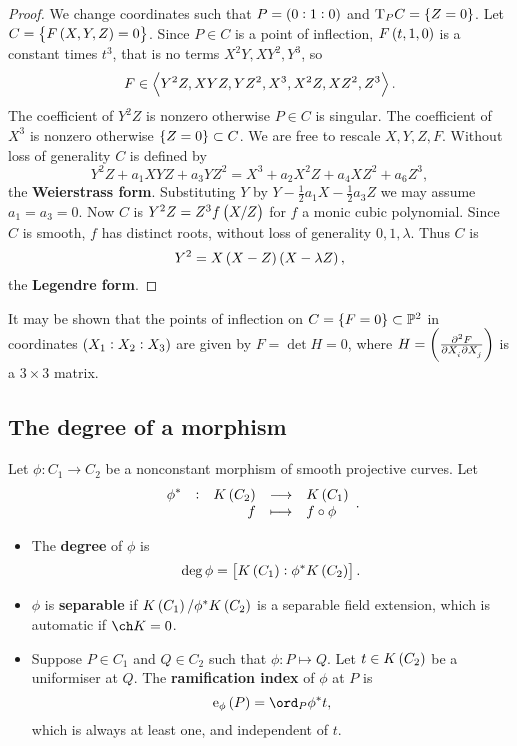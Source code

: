 \begin{proof}
We change coordinates such that $ P = \br{0 : 1 : 0} $ and $ \T_PC = \cbr{Z = 0} $. Let $ C = \cbr{F\br{X, Y, Z} = 0} $. Since $ P \in C $ is a point of inflection, $ F\br{t, 1, 0} $ is a constant times $ t^3 $, that is no terms $ X^2Y, XY^2, Y^3 $, so
$$ F \in \left\langle Y^2Z, XYZ, YZ^2, X^3, X^2Z, XZ^2, Z^3 \right\rangle. $$
The coefficient of $ Y^2Z $ is nonzero otherwise $ P \in C $ is singular. The coefficient of $ X^3 $ is nonzero otherwise $ \cbr{Z = 0} \subset C $. We are free to rescale $ X, Y, Z, F $. Without loss of generality $ C $ is defined by
$$ Y^2Z + a_1XYZ + a_3YZ^2 = X^3 + a_2X^2Z + a_4XZ^2 + a_6Z^3, $$
the \textbf{Weierstrass form}. Substituting $ Y $ by $ Y - \tfrac{1}{2}a_1X - \tfrac{1}{2}a_3Z $ we may assume $ a_1 = a_3 = 0 $. Now $ C $ is $ Y^2Z = Z^3f\br{X / Z} $ for $ f $ a monic cubic polynomial. Since $ C $ is smooth, $ f $ has distinct roots, without loss of generality $ 0, 1, \lambda $. Thus $ C $ is
$$ Y^2 = X\br{X - Z}\br{X - \lambda Z}, $$
the \textbf{Legendre form}.
\end{proof}

\begin{remark*}
It may be shown that the points of inflection on $ C = \cbr{F = 0} \subset \PP^2 $ in coordinates $ \br{X_1 : X_2 : X_3} $ are given by $ F = \det H = 0 $, where $ H = \br{\tmd{F}{2}{X_i}{}{X_j}{}} $ is a $ 3 \times 3 $ matrix.
\end{remark*}

\subsection{The degree of a morphism}

\begin{definition*}
Let $ \phi : C_1 \to C_2 $ be a nonconstant morphism of smooth projective curves. Let
$$ \function[\phi^*]{K\br{C_2}}{K\br{C_1}}{f}{f \circ \phi}. $$
\begin{itemize}
\item The \textbf{degree} of $ \phi $ is
$$ \deg \phi = \sbr{K\br{C_1} : \phi^*K\br{C_2}}. $$
\item $ \phi $ is \textbf{separable} if $ K\br{C_1} / \phi^*K\br{C_2} $ is a separable field extension, which is automatic if $ \ch K = 0 $.
\item Suppose $ P \in C_1 $ and $ Q \in C_2 $ such that $ \phi : P \mapsto Q $. Let $ t \in K\br{C_2} $ be a uniformiser at $ Q $. The \textbf{ramification index} of $ \phi $ at $ P $ is
$$ \e_\phi\br{P} = \ord_P \phi^*t, $$
which is always at least one, and independent of $ t $.
\end{itemize}
\end{definition*}

